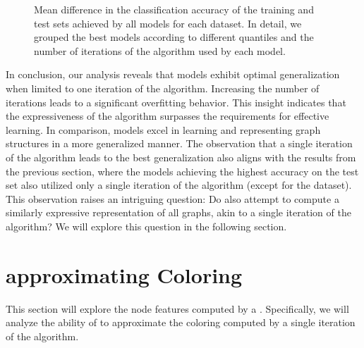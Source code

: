 \begin{figure}[htb]
\begin{subfigure}[b]{0.3\textwidth}
		\vspace*{-4ex} 
	\end{subfigure}
	\caption{Mean difference in the classification accuracy of the training and test sets achieved by all \wlnn models for each dataset. In detail, we grouped the best models according to different quantiles and the number of iterations of the \wl algorithm used by each model.}
	\label{fig:performance_diff_wlnn}
\end{figure}

In conclusion, our analysis reveals that \wlnn models exhibit optimal generalization when limited to one iteration of the \wl algorithm. Increasing the number of iterations leads to a significant overfitting behavior. This insight indicates that the expressiveness of the \wl algorithm surpasses the requirements for effective learning. In comparison, \gnn models excel in learning and representing graph structures in a more generalized manner. The observation that a single iteration of the \wl algorithm leads to the best generalization also aligns with the results from the previous section, where the models achieving the highest accuracy on the test set also utilized only a single iteration of the \wl algorithm (except for the \nci dataset). This observation raises an intriguing question: Do \gnns also attempt to compute a similarly expressive representation of all graphs, akin to a single iteration of the \wl algorithm? We will explore this question in the following section.

\FloatBarrier
\section{\gnns approximating \wl Coloring}
This section will explore the node features computed by a \gnn. Specifically, we will analyze the ability of \gnns to approximate the coloring computed by a single iteration of the \wl algorithm.

